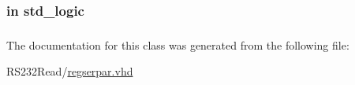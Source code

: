 \subsubsection[{Rx}]{ {\bfseries \textcolor{keywordflow}{in}\textcolor{vhdlchar}{ }} {\bfseries \textcolor{comment}{std\+\_\+logic}\textcolor{vhdlchar}{ }} \hspace{0.3cm}{\ttfamily [Port]}}\label{class_reg_ser_par_a5b7b5dfa3fdd403b397fc3a20f75ec69}
\hypertarget{class_reg_ser_par_acd03516902501cd1c7296a98e22c6fcb}{}
\subsubsection[{std\+\_\+logic\+\_\+1164}]{\hspace{0.3cm}{\ttfamily [Package]}}\label{class_reg_ser_par_acd03516902501cd1c7296a98e22c6fcb}


The documentation for this class was generated from the following file\+:\begin{DoxyCompactItemize}
\item 
R\+S232\+Read/\hyperlink{regserpar_8vhd}{regserpar.\+vhd}\end{DoxyCompactItemize}
